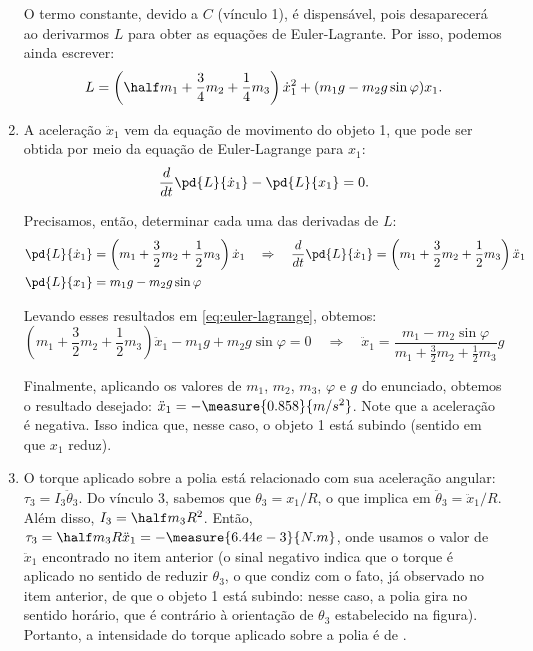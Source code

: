 \begin{question}
\begin{solution}
\begin{enumerate}
			O termo constante, devido a $C$ (vínculo 1), é dispensável, pois desaparecerá ao derivarmos $L$ para obter as equações de Euler-Lagrante.
			Por isso, podemos ainda escrever:
			\begin{equation*}
				L = \left(\half m_1 + \frac{3}{4}m_2 + \frac{1}{4}m_3\right)\dot x_1^2 + (m_1 g - m_2 g \sin\varphi)x_1.
			\end{equation*}

			\item A aceleração $\ddot x_1$ vem da equação de movimento do objeto 1, que pode ser obtida por meio da equação de Euler-Lagrange para $x_1$:
			\begin{equation}\label{eq:euler-lagrange}
				\frac{d}{dt}\pd{L}{\dot x_1} - \pd{L}{x_1} = 0.
			\end{equation}

			Precisamos, então, determinar cada uma das derivadas de $L$:
			\begin{align*}
				\pd{L}{\dot x_1} &= \left(m_1 + \frac{3}{2}m_2 + \frac{1}{2}m_3\right)\dot x_1 \quad\Rightarrow\quad
					\frac{d}{dt}\pd{L}{\dot x_1} = \left(m_1 + \frac{3}{2}m_2 + \frac{1}{2}m_3\right)\ddot x_1 \\
				\pd{L}{x_1} &= m_1g - m_2g\sin\varphi
			\end{align*}

			Levando esses resultados em \eqref{eq:euler-lagrange}, obtemos:
			\begin{equation*}
				\left(m_1 + \frac{3}{2}m_2 + \frac{1}{2}m_3\right)\ddot x_1 - m_1 g + m_2 g \sin \varphi = 0
				\quad\Rightarrow\quad
				\ddot x_1 = \frac{m_1 - m_2 \sin \varphi}{m_1 + \frac{3}{2}m_2 + \frac{1}{2}m_3}g
			\end{equation*}

			Finalmente, aplicando os valores de $m_1$, $m_2$, $m_3$, $\varphi$ e $g$ do enunciado, obtemos o resultado desejado: $\ddot x_1 = -\measure{0.858}{m/s^2}$. %
			Note que a aceleração é negativa.
			Isso indica que, nesse caso, o objeto 1 está subindo (sentido em que $x_1$ reduz).

			\item O torque aplicado sobre a polia está relacionado com sua aceleração angular: $\tau_3 = I_3 \ddot\theta_3$.
			Do vínculo 3, sabemos que $\theta_3 = x_1/R$, o que implica em $\ddot\theta_3 = \ddot x_1/R$.
			Além disso, $I_3 = \half m_3 R^2$.
			Então, $\tau_3 = \half m_3 R \ddot x_1 = -\measure{6.44e-3}{N.m}$, onde usamos o valor de $\ddot x_1$ encontrado no item anterior (o sinal negativo indica que o torque é aplicado no sentido de reduzir $\theta_3$, o que condiz com o fato, já observado no item anterior, de que o objeto 1 está subindo: nesse caso, a polia gira no sentido horário, que é contrário à orientação de $\theta_3$ estabelecido na figura). %
			Portanto, a intensidade do torque aplicado sobre a polia é de . %
		\end{enumerate}
	\end{solution}
\end{question}
